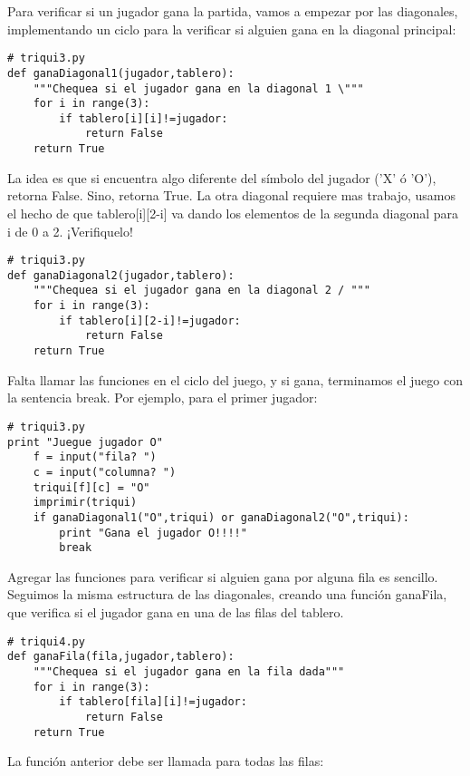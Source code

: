 Para verificar si un jugador gana la partida, vamos a empezar por las diagonales, 
implementando un ciclo para la verificar si alguien gana en la diagonal principal:

\beforeverb
\begin{verbatim}
# triqui3.py
def ganaDiagonal1(jugador,tablero):
    """Chequea si el jugador gana en la diagonal 1 \"""
    for i in range(3):
        if tablero[i][i]!=jugador:
            return False
    return True
\end{verbatim}
\afterverb

La idea es que si encuentra algo diferente del símbolo del jugador ('X' ó 'O'),
retorna False. Sino, retorna True. La otra diagonal requiere mas trabajo, usamos 
el hecho de que tablero[i][2-i] va dando los elementos de la segunda
diagonal para i de 0 a 2. ¡Verifiquelo!

\beforeverb
\begin{verbatim}
# triqui3.py
def ganaDiagonal2(jugador,tablero):
    """Chequea si el jugador gana en la diagonal 2 / """
    for i in range(3):
        if tablero[i][2-i]!=jugador:
            return False
    return True
\end{verbatim}
\afterverb

Falta llamar las funciones en el ciclo del juego, y si gana, terminamos el juego 
con la sentencia break. Por ejemplo, para el primer jugador:

\beforeverb
\begin{verbatim}
# triqui3.py
print "Juegue jugador O"
    f = input("fila? ")
    c = input("columna? ")
    triqui[f][c] = "O"
    imprimir(triqui)
    if ganaDiagonal1("O",triqui) or ganaDiagonal2("O",triqui):
        print "Gana el jugador O!!!!"
        break
\end{verbatim}
\afterverb

Agregar las funciones para verificar si alguien gana por alguna fila es sencillo.
Seguimos la misma estructura de las diagonales, creando una función ganaFila, que
verifica si el jugador gana en una de las filas del tablero.

\beforeverb
\begin{verbatim}
# triqui4.py
def ganaFila(fila,jugador,tablero):
    """Chequea si el jugador gana en la fila dada"""
    for i in range(3):
        if tablero[fila][i]!=jugador:
            return False
    return True
\end{verbatim}
\afterverb

La función anterior debe ser llamada para todas las filas:

